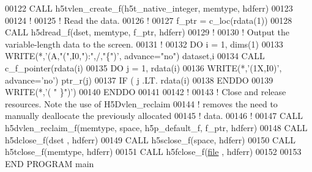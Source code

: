 \begin{DoxyCode}
00122   \textcolor{keyword}{CALL }h5tvlen\_create\_f(h5t\_native\_integer, memtype, hdferr)
00123 
00124   \textcolor{comment}{!}
00125   \textcolor{comment}{! Read the data.}
00126   \textcolor{comment}{!}
00127   f\_ptr = c\_loc(rdata(1))
00128   \textcolor{keyword}{CALL }h5dread\_f(dset, memtype, f\_ptr, hdferr)
00129   \textcolor{comment}{!}
00130   \textcolor{comment}{! Output the variable-length data to the screen.}
00131   \textcolor{comment}{!}
00132   \textcolor{keywordflow}{DO} i = 1, dims(1)
00133      \textcolor{keyword}{WRITE}(*,\textcolor{stringliteral}{'(A,"(",I0,"):",/,"\{")'}, advance=\textcolor{stringliteral}{"no"}) dataset,i
00134      \textcolor{keyword}{CALL }c\_f\_pointer(rdata(i)%
00135      \textcolor{keywordflow}{DO} j = 1, rdata(i)%
00136         \textcolor{keyword}{WRITE}(*,\textcolor{stringliteral}{'(1X,I0)'}, advance=\textcolor{stringliteral}{'no'}) ptr\_r(j)
00137         \textcolor{keywordflow}{IF} ( j .LT. rdata(i)%
00138 \textcolor{keywordflow}{     ENDDO}
00139      \textcolor{keyword}{WRITE}(*,\textcolor{stringliteral}{'( " \}")'})
00140 \textcolor{keywordflow}{  ENDDO}
00141 
00142   \textcolor{comment}{!}
00143   \textcolor{comment}{! Close and release resources.  Note the use of H5Dvlen\_reclaim}
00144   \textcolor{comment}{! removes the need to manually deallocate the previously allocated}
00145   \textcolor{comment}{! data.}
00146   \textcolor{comment}{!}
00147   \textcolor{keyword}{CALL }h5dvlen\_reclaim\_f(memtype, space, h5p\_default\_f, f\_ptr, hdferr)
00148   \textcolor{keyword}{CALL }h5dclose\_f(dset , hdferr)
00149   \textcolor{keyword}{CALL }h5sclose\_f(space, hdferr)
00150   \textcolor{keyword}{CALL }h5tclose\_f(memtype, hdferr)
00151   \textcolor{keyword}{CALL }h5fclose\_f(\hyperlink{structfile}{file} , hdferr)
00152 
00153 \textcolor{keyword}{END PROGRAM }main
\end{DoxyCode}
